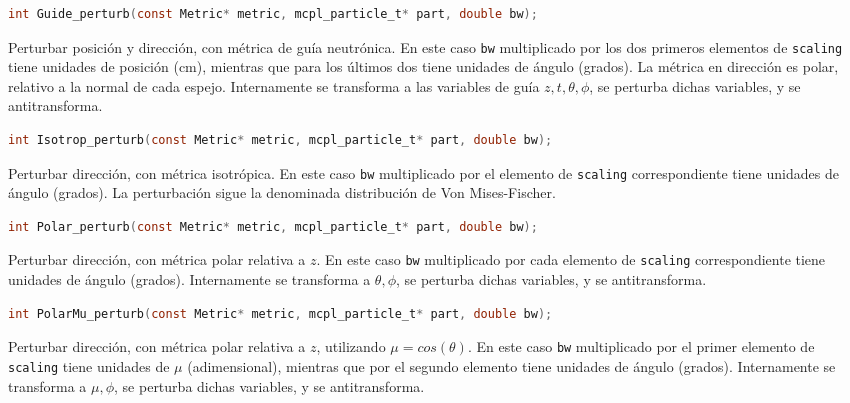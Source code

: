 \begin{footnotesize}
\begin{lstlisting}[language=C]
int Guide_perturb(const Metric* metric, mcpl_particle_t* part, double bw);
\end{lstlisting}
\begin{addmargin}[0.5cm]{0cm}
Perturbar posición y dirección, con métrica de guía neutrónica. En este caso \verb|bw| multiplicado por los dos primeros elementos de \verb|scaling| tiene unidades de posición (cm), mientras que para los últimos dos tiene unidades de ángulo (grados). La métrica en dirección es polar, relativo a la normal de cada espejo. Internamente se transforma a las variables de guía $z,t,\theta,\phi$, se perturba dichas variables, y se antitransforma.
\end{addmargin}

\begin{lstlisting}[language=C]
int Isotrop_perturb(const Metric* metric, mcpl_particle_t* part, double bw);
\end{lstlisting}
\begin{addmargin}[0.5cm]{0cm}
Perturbar dirección, con métrica isotrópica. En este caso \verb|bw| multiplicado por el elemento de \verb|scaling| correspondiente tiene unidades de ángulo (grados). La perturbación sigue la denominada distribución de Von Mises-Fischer.
\end{addmargin}

\begin{lstlisting}[language=C]
int Polar_perturb(const Metric* metric, mcpl_particle_t* part, double bw);
\end{lstlisting}
\begin{addmargin}[0.5cm]{0cm}
Perturbar dirección, con métrica polar relativa a $z$. En este caso \verb|bw| multiplicado por cada elemento de \verb|scaling| correspondiente tiene unidades de ángulo (grados). Internamente se transforma a $\theta,\phi$, se perturba dichas variables, y se antitransforma.
\end{addmargin}

\begin{lstlisting}[language=C]
int PolarMu_perturb(const Metric* metric, mcpl_particle_t* part, double bw);
\end{lstlisting}
\begin{addmargin}[0.5cm]{0cm}
Perturbar dirección, con métrica polar relativa a $z$, utilizando $\mu=cos(\theta)$. En este caso \verb|bw| multiplicado por el primer elemento de \verb|scaling| tiene unidades de $\mu$ (adimensional), mientras que por el segundo elemento tiene unidades de ángulo (grados). Internamente se transforma a $\mu,\phi$, se perturba dichas variables, y se antitransforma.
\end{addmargin}


\end{footnotesize}
